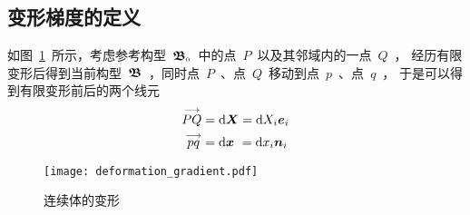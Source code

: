 \subsection{变形梯度的定义}
如图~\ref{fig:F}~所示，考虑参考构型~$\bm{\mathfrak{B}}_{\scriptscriptstyle 0}$~中的点~$P$~以及其邻域内的一点~$Q$~，
经历有限变形后得到当前构型~$\bm{\mathfrak{B}}$~，同时点~$P$~、点~$Q$~移动到点~$p$~、点~$q$~，
于是可以得到有限变形前后的两个线元
\begin{subequations}\label{eq:line_x}
	\begin{align}
	\stackrel{\longrightarrow}{PQ} & =\mathop{}\!\mathrm{d} \bm{X}=\mathop{}\!\mathrm{d} X_i \bm{e}_i \label{eq:dX} \\
	\stackrel{\longrightarrow}{pq} & =\mathop{}\!\mathrm{d} \bm{x}~=\mathop{}\!\mathrm{d} x_i \bm{n}_i \label{eq:dx}
	\end{align}
\end{subequations}

\begin{figure}[!h]
	\centering
	\texttt{[image: deformation\_gradient.pdf]}
	\caption{连续体的变形}
	\label{fig:F}
\end{figure}

